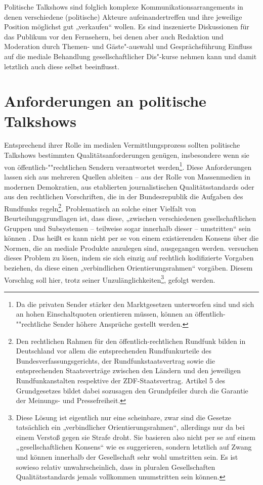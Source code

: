 Politische Talkshows sind folglich komplexe Kommunikationsarrangements in denen verschiedene (politische) Akteure aufeinandertreffen und ihre jeweilige Position möglichst gut „verkaufen“ wollen. Es sind inszenierte Diskussionen für das Publikum vor den Fernsehern, bei denen aber auch Redaktion und Moderation durch Themen- und Gäste"-auswahl und Gesprächsführung Einfluss auf die mediale Behandlung gesellschaftlicher Dis"-kurse nehmen kann und damit letztlich auch diese selbst beeinflusst.

\section{Anforderungen an politische Talkshows}\label{chap:anforderungen}

Entsprechend ihrer Rolle im medialen Vermittlungsprozess sollten politische Talkshows bestimmten Qualitätsanforderungen genügen, insbesondere wenn sie von öffentlich-""rechtlichen Sendern verantwortet werden\footnote{Da die privaten Sender stärker den Marktgesetzen unterworfen sind und sich an hohen Einschaltquoten orientieren müssen, können an öffentlich-""rechtliche Sender höhere Ansprüche gestellt werden.}. Diese Anforderungen lassen sich aus mehreren Quellen ableiten – aus der Rolle von Massenmedien in modernen Demokratien, aus etablierten journalistischen Qualitätsstandards oder aus den rechtlichen Vorschriften, die in der Bundesrepublik die Aufgaben des Rundfunks regeln\footnote{Den rechtlichen Rahmen für den öffentlich-rechtlichen Rundfunk bilden in Deutschland vor allem die entsprechenden Rundfunkurteile des Bundesverfassungsgerichts, der Rundfunkstaatsvertrag sowie die entsprechenden Staatsverträge zwischen den Ländern und den jeweiligen Rundfunkanstalten respektive der ZDF-Staatsvertrag. Artikel 5 des Grundgesetzes bildet dabei sozusagen den Grundpfeiler durch die Garantie der Meinungs- und Pressefreiheit.}. Problematisch an solche einer Vielfalt von Beurteilungsgrundlagen ist, dass diese, „zwischen verschiedenen gesellschaftlichen Gruppen und Subsystemen – teilweise sogar innerhalb dieser – umstritten“ sein können \parencite[691]{schatzQualitaetFernsehprogrammenKriterien1992}. Das heißt es kann nicht per se von einem existierenden Konsens über die Normen, die an mediale Produkte anzulegen sind, ausgegangen werden. \textcite{schatzQualitaetFernsehprogrammenKriterien1992} versuchen dieses Problem zu lösen, indem sie sich einzig auf rechtlich kodifizierte Vorgaben beziehen, da diese einen „verbindlichen Orientierungsrahmen“ \parencite[691]{schatzQualitaetFernsehprogrammenKriterien1992} vorgäben. Diesem Vorschlag soll hier, trotz seiner Unzulänglichkeiten\footnote{Diese Lösung ist eigentlich nur eine scheinbare, zwar sind die Gesetze tatsächlich ein „verbindlicher Orientierungsrahmen“, allerdings nur da bei einem Verstoß gegen sie Strafe droht. Sie basieren also nicht per se auf einem „gesellschaftlichen Konsens“ wie es \textcite{schatzQualitaetFernsehprogrammenKriterien1992} suggerieren, sondern letztlich auf Zwang und können innerhalb der Gesellschaft sehr wohl umstritten sein. Es ist sowieso relativ unwahrscheinlich, dass in pluralen Gesellschaften Qualitätsstandards jemals vollkommen unumstritten sein können.}, gefolgt werden.

